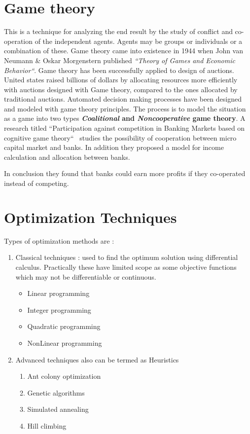 \section{Game theory}
\label{game-theory}
This is a technique for analyzing the end result by the study of conflict and co-operation of the independent agents. Agents may be groups or individuals or a combination of these. Game theory came into existence in 1944 when John van Neumann \& Oskar Morgenstern published \textit{``Theory of Games and Economic Behavior``}.
Game theory has been successfully applied to design of auctions. 
United states raised billions of dollars by allocating resources more efficiently with auctions designed with Game theory, compared to the ones allocated by traditional auctions.
Automated decision making processes have been designed and modeled with game theory principles. The process is to model the situation as a game into two types \textbf{ \textit{Coalitional} and \textit{Noncooperative} game theory}.
\newline A research titled ``Participation against competition in Banking Markets based on cognitive game theory``~ studies the possibility of cooperation between micro capital market and banks. In addition they proposed a model for income calculation and allocation between banks.

In conclusion they found that banks could earn more profits if they co-operated instead of competing.


%

%
%
%

\setlength{\footskip}{8mm}

\section{Optimization Techniques} 
\label{optimization-techniques}
Types of optimization methods are :
\begin{enumerate}
	\item Classical techniques : used to find the optimum solution using differential calculus. Practically these have limited scope as some objective functions which may not be differentiable or continuous. 
	\begin{itemize}
		\item Linear programming
		\item Integer programming
		\item Quadratic programming
		\item NonLinear programming
	\end{itemize}
	\item Advanced techniques also can be termed as Heuristics
	\begin{enumerate}
		\item Ant colony optimization
		\item Genetic algorithms
		\item Simulated annealing
		\item Hill climbing
	\end{enumerate}
\end{enumerate}

